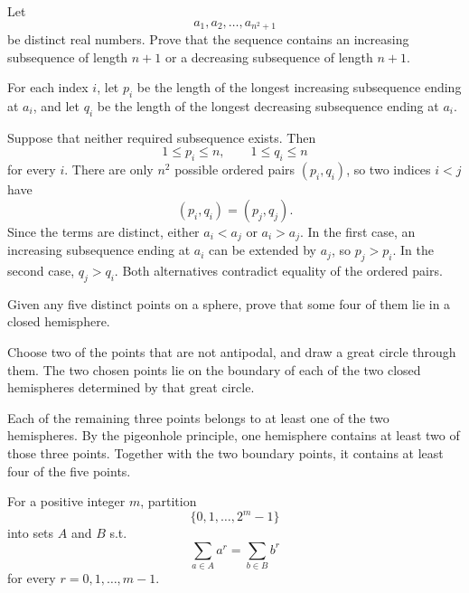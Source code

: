     \begin{expectedproblem}
        Let
        \[
            a_1,a_2,\ldots,a_{n^2+1}
        \]
        be distinct real numbers. Prove that the sequence contains an
        increasing subsequence of length $n+1$ or a decreasing subsequence of
        length $n+1$.
    \end{expectedproblem}

    \begin{solution}
        For each index $i$, let $p_i$ be the length of the longest increasing
        subsequence ending at $a_i$, and let $q_i$ be the length of the longest
        decreasing subsequence ending at $a_i$.

        Suppose that neither required subsequence exists. Then
        \[
            1\leq p_i\leq n,
            \qquad
            1\leq q_i\leq n
        \]
        for every $i$. There are only $n^2$ possible ordered pairs
        $(p_i,q_i)$, so two indices $i<j$ have
        \[
            (p_i,q_i)=(p_j,q_j).
        \]
        Since the terms are distinct, either $a_i<a_j$ or $a_i>a_j$. In the
        first case, an increasing subsequence ending at $a_i$ can be extended by
        $a_j$, so $p_j>p_i$. In the second case, $q_j>q_i$. Both alternatives
        contradict equality of the ordered pairs.
    \end{solution}

    \begin{expectedproblem}[2002 Putnam]
        Given any five distinct points on a sphere, prove that some four of them
        lie in a closed hemisphere.
    \end{expectedproblem}

    \begin{solution}
        Choose two of the points that are not antipodal, and draw a great circle
        through them. The two chosen points lie on the boundary of each of the
        two closed hemispheres determined by that great circle.

        Each of the remaining three points belongs to at least one of the two
        hemispheres. By the pigeonhole principle, one hemisphere contains at
        least two of those three points. Together with the two boundary points,
        it contains at least four of the five points.
    \end{solution}

    \begin{expectedproblem}
        For a positive integer $m$, partition
        \[
            \{0,1,\ldots,2^m-1\}
        \]
        into sets $A$ and $B$ s.t.
        \[
            \sum_{a\in A}a^r
            =
            \sum_{b\in B}b^r
        \]
        for every $r=0,1,\ldots,m-1$.
    \end{expectedproblem}

